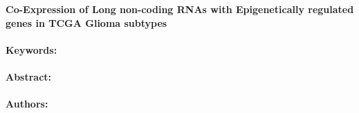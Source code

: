 \noindent
\large {\bf Co-Expression of Long non-coding RNAs with Epigenetically regulated genes in TCGA Glioma subtypes} 


\normalsize 


\noindent \paragraph{Keywords:} 

\noindent \paragraph{Abstract:} 



\noindent \paragraph{Authors:} 

